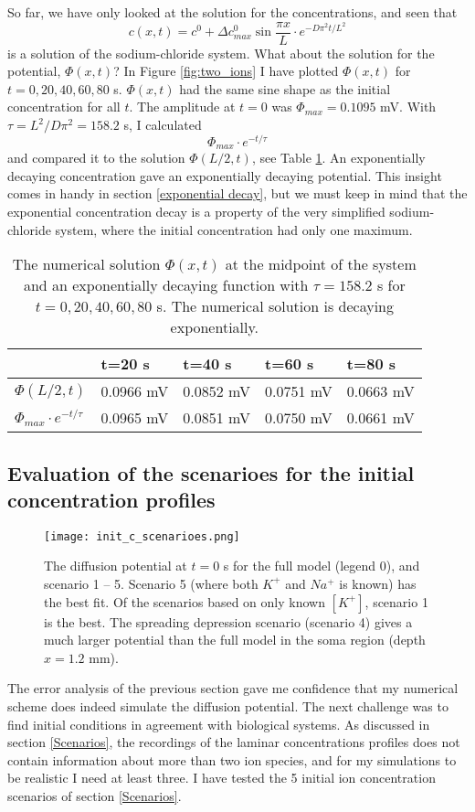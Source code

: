 \documentclass{article}
\begin{document}
So far, we have only looked at the solution for the concentrations, and seen that $$c(x,t) =c^0 + \Delta c^0_{max} \sin \frac{ \pi x}{L}\cdot e^{-D\pi^2 t /L^2}$$ is a solution of the sodium-chloride system. What about the solution for the potential, $\Phi(x,t)$? In Figure \ref{fig:two_ions} I have plotted $\Phi(x,t)$ for $t=0,20,40,60,80$ s. $\Phi(x,t)$ had the same sine shape as the initial concentration for all $t$. The amplitude at $t=0$ was $\Phi_{max} = 0.1095$ mV. With $\tau = L^2/D\pi^2 = 158.2$ s, I calculated 
$$\Phi_{max} \cdot e^{-t/{\tau}}$$ and compared it to the solution $\Phi(L/2,t)$, see Table \ref{tab:error2}. An exponentially decaying concentration gave an exponentially decaying potential. This insight comes in handy in section \ref{exponential decay}, but we must keep in mind that the exponential concentration decay is a property of the very simplified sodium-chloride system, where the initial concentration had only one maximum. 

\begin{table}[h!]
  \centering
  \caption{The numerical solution $\Phi(x,t)$ at the midpoint of the system and an exponentially decaying function with $\tau = 158.2$ s for $t=0,20,40,60,80$ s. The numerical solution is decaying exponentially. }
  \label{tab:error2}
  \begin{tabular}{l||l|l|l|l}
 & t=20 s & t=40 s & t=60 s & t=80 s\\
 \hline
$\Phi(L/2,t)$  & 0.0966 mV &  0.0852 mV & 0.0751 mV & 0.0663 mV\\
\hline
$\Phi_{max} \cdot e^{-t/{\tau}}$  & 0.0965 mV & 0.0851 mV & 0.0750 mV & 0.0661 mV\\


 \end{tabular}
\end{table}


\subsection{Evaluation of the scenarioes for the initial concentration profiles}\label{The K/Na assumtion}

\begin{figure}
  \texttt{[image: init\_c\_scenarioes.png]}
  \caption{The diffusion potential at $t=0$ s for the full model (legend 0), and scenario 1 -- 5. Scenario 5 (where both $K^+$ and $Na^+$ is known) has the best fit. Of the scenarios based on only known $[K^+]$, scenario 1 is the best. The spreading depression scenario (scenario 4) gives a much larger potential than the full model in the soma region (depth $x=1.2$ mm). }
  \label{fig:init_c_scenarioes}
\end{figure}
The error analysis of the previous section gave me confidence that my numerical scheme does indeed simulate the diffusion potential. The next challenge was to find initial conditions in agreement with biological systems. As discussed in section \ref{Scenarios}, the recordings of the laminar concentrations profiles does not contain information about more than two ion species, and for my simulations to be realistic I need at least three. I have tested the 5 initial ion concentration scenarios of section \ref{Scenarios}. 
\end{document}
